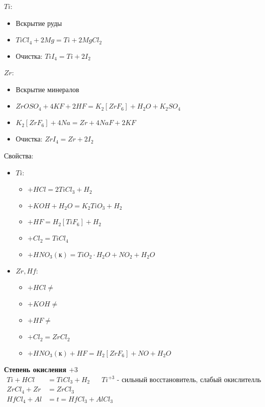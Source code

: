 \begin{figure} [H]
	\centering {\texttt{[image: aa2]}}
\end{figure}
$Ti$: \\ 
\begin{itemize}
	\item Вскрытие руды
	\item $TiCl_4 + 2 Mg = Ti + 2MgCl_2$
	\item Очистка: $TiI_4 = Ti + 2I_2$
\end{itemize}
$Zr$: \\ 
\begin{itemize}
	\item Вскрытие минералов
	\item $ZrOSO_4 + 4 KF + 2HF = K_2\left[ZrF_6 \right] + H_2O + K_2SO_4$
	\item $K_2\left[ZrF_6 \right] + 4Na = Zr + 4NaF + 2KF$
	\item Очистка: $ZrI_4 = Zr + 2I_2$
\end{itemize}
Свойства:
\begin{itemize}
	\item $Ti$:
	\begin{itemize}
		\item $+ HCl = 2TiCl_3 + H_2$
		\item $+ KOH + H_2O = K_2TiO_3 + H_2 $
		\item $+ HF = H_2\left[TiF_6 \right] + H_2 $
		\item $+ Cl_2 = TiCl_4 $
		\item $+ HNO_3(\text{к}) = TiO_2 \cdot H_2O + NO_2 + H_2O $		
	\end{itemize}
	\item $Zr, Hf$:
	\begin{itemize}
		\item $+ HCl \not = $
		\item $+ KOH \not = $
		\item $+ HF \not = $
		\item $+ Cl_2 = ZrCl_2$
		\item $+ HNO_3(\text{к}) + HF  = H_2\left[ZrF_6 \right] + NO + H_2O $		
	\end{itemize}
\end{itemize}
\textbf{Степень окисления $+3$} 
\begin{align*}
Ti + HCl &= TiCl_3 + H_2 \quad \text{ $Ti^{+3}$ - сильный восстановитель, слабый окислителль}\\
ZrCl_4 + Zr &= ZrCl_3 \\
HfCl_4 + Al &= t = HfCl_3 + AlCl_3 
\end{align*}	

